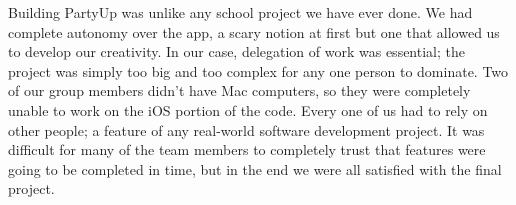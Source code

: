 \documentclass[12pt]{article}
\begin{document}
Building PartyUp was unlike any school project we have ever done. 
We had complete autonomy over the app, a scary notion at first but one that allowed us to develop our creativity. 
In our case, delegation of work was essential; the project was simply too big and too complex for any one person to dominate. 
Two of our group members didn't have Mac computers, so they were completely unable to work on the iOS portion of the code. 
Every one of us had to rely on other people; a feature of any real-world software development project. 
It was difficult for many of the team members to completely trust that features were going to be completed in time, but in the end we were all satisfied with the final project.
\end{document}
